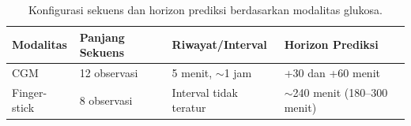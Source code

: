 \begin{table}[!htbp] 
  \centering 
  \caption{Konfigurasi sekuens dan horizon prediksi berdasarkan modalitas glukosa.} 
  \label{tab:tab4.1_konfigurasi_sekuens_horizon} 
  \begin{tabularx}{\textwidth}{@{}l L L L@{}}
    \hline
    \textbf{Modalitas} & 
    \textbf{Panjang Sekuens} & 
    \textbf{Riwayat/Interval} & 
    \textbf{Horizon Prediksi} \\ 
    \hline CGM & 12 observasi & 5 menit, $\sim$1 jam & +30 dan +60 menit \\ 
    Finger-stick & 8 observasi & Interval tidak teratur & $\sim$240 menit (180--300 menit) \\ 
    \hline
  \end{tabularx}
\end{table}

